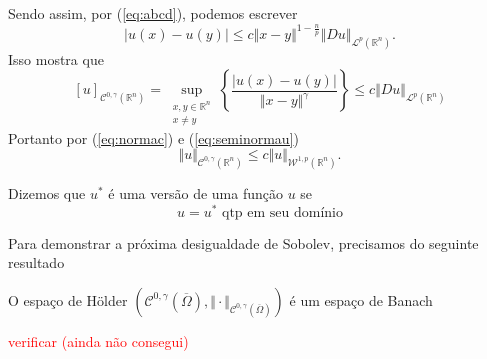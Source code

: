 \documentclass[a4paper, 11pt]{book}
\theoremstyle{definition}
\newcommand{\bR}{\mathbb{R}}
\newcommand{\cC}{\mathcal{C}}
\newcommand{\cL}{\mathcal{L}}
\newcommand{\cW}{\mathcal{W}}
\begin{document}
\begin{prf}
    Sendo assim, por (\ref{eq:abcd}), podemos escrever
    \[
        |u(x) - u(y)| \leqslant c \Vert x - y \Vert^{1 - \frac{n}{p}} \Vert Du \Vert_{\cL^p(\bR^n)}.
    \]
    Isso mostra que
    \begin{equation} \label{eq:seminormau}
        [u]_{\cC^{0,\gamma}(\bR^n)} = \sup_{\substack{x,y \in \bR^n\\x \neq y}} \left\{ \frac{|u(x) - u(y)|}{\Vert x - y \Vert^{\gamma}} \right\} \leqslant c \Vert Du \Vert_{\cL^p(\bR^n)}
    \end{equation}
    Portanto por (\ref{eq:normac}) e (\ref{eq:seminormau})
    \[
        \Vert u \Vert_{\cC^{0,\gamma}(\bR^n)} \leqslant c \Vert u \Vert_{\cW^{1,p}(\bR^n)}.
    \]
\end{prf}

\begin{dbox}
    Dizemos que $u^*$ é uma versão de uma função $u$ se
    \[
        u = u^* \text{ qtp em seu domínio}
    \]
\end{dbox}

Para demonstrar a próxima desigualdade de Sobolev, precisamos do seguinte resultado

\begin{tbox}
    O espaço de Hölder $(\cC^{0,\gamma}(\overline\Omega), \Vert \cdot \Vert_{\cC^{0,\gamma}(\overline\Omega)})$ é um espaço de Banach
\end{tbox}
\begin{prf}
    \textcolor{red}{verificar (ainda não consegui)}
\end{prf}
\end{document}
